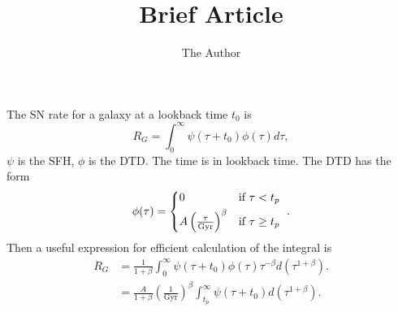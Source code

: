 \documentclass[11pt, oneside]{article}   	%
\title{Brief Article}
\author{The Author}
\begin{document}
\maketitle
The SN rate for a galaxy at a lookback time $t_0$ is
\begin{equation}
R_G=\int_{0}^{\infty} \psi(\tau+t_0) \phi(\tau) d\tau,
\end{equation}
$\psi$ is the SFH, $\phi$ is the DTD.  The time is in lookback time.
The DTD has the form
\begin{equation}
\phi(\tau) =  
\begin{cases*} 
            0  &  if $\tau < t_p$  \\
             A \left(\frac{\tau}{\mathrm{Gyr}} \right)^\beta  & if $\tau \geq t_p$ 
          \end{cases*}.
\end{equation}
Then a useful expression for efficient calculation of the integral is
\begin{align}
R_G &= \frac{1}{1+\beta}  \int_{0}^{\infty} \psi(\tau+t_0)  \phi(\tau)\tau^{-\beta}  d(\tau^{1+\beta}). \\
 &= \frac{A}{1+\beta}  \left(\frac{1}{\mathrm{Gyr}} \right)^\beta \int_{t_p}^{\infty} \psi(\tau+t_0) d(\tau^{1+\beta}).
 \end{align}
\end{document}
